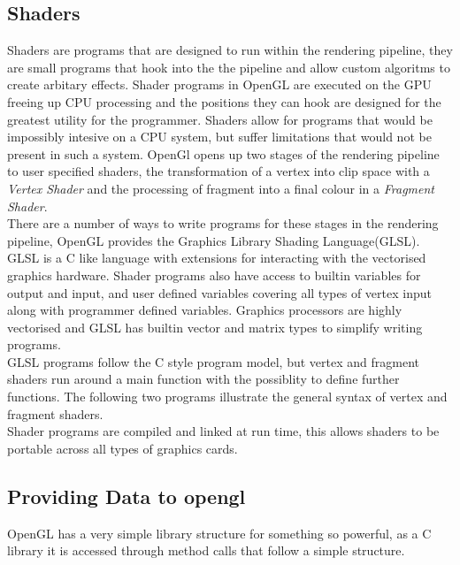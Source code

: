 \subsection{Shaders}
Shaders are programs that are designed to run within the rendering pipeline, they
are small programs that hook into the the pipeline and allow custom algoritms to
create arbitary effects. Shader programs in OpenGL are executed on the GPU 
freeing up CPU processing and the positions they can hook are designed for the
greatest utility for the programmer. Shaders allow for programs that would be 
impossibly intesive on a CPU system, but suffer limitations that would not be 
present in such a system.
OpenGl opens up two stages of the rendering
pipeline to user specified shaders, the transformation of a vertex into clip 
space with a \emph{Vertex Shader} and the processing of fragment into a final
colour in a \emph{Fragment Shader}.\\

There are a number of ways to write programs for these stages in the rendering
pipeline, OpenGL provides the Graphics Library Shading Language(GLSL). GLSL is 
a C like language with extensions for interacting with the vectorised graphics
hardware. Shader programs also have access to builtin variables for output and
input, and user defined variables covering all types of vertex input along with
programmer defined variables. Graphics processors are highly vectorised and GLSL
has builtin vector and matrix types to simplify writing programs.\\

GLSL programs follow the C style program model, but vertex and fragment shaders 
run around a main function with the possiblity to define further functions. The 
following two programs illustrate the general syntax of vertex and fragment 
shaders.\\





Shader programs are compiled and linked at run time, this allows shaders to be 
portable across all types of graphics cards.\\

\subsection{Providing Data to opengl}
OpenGL has a very simple library structure for something so powerful, as a C 
library it is accessed through method calls that follow a simple structure.\\

